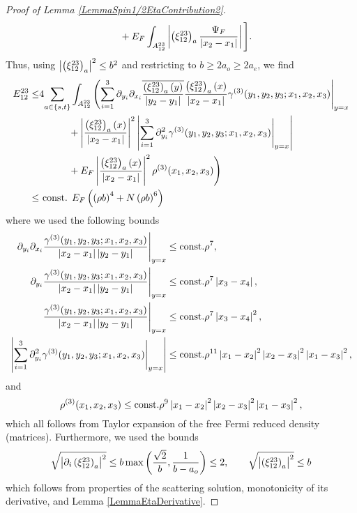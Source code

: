 \begin{proof}[Proof of Lemma \ref{LemmaSpin1/2EtaContribution2}]
\begin{equation}
\begin{aligned}
&\qquad + E_F\int_{A_{12}^{23}} \left\lvert \left(\xi_{12}^{23}\right)_a \frac{\Psi_F}{\left\lvert x_2-x_1 \right\rvert} \right\rvert\Bigg].
\end{aligned}
\end{equation}
 Thus, using $ \left\lvert \left(\xi_{12}^{23}\right)_a \right\rvert^2\leq b^2 $ and restricting to $ b\geq 2a_o\geq2a_e $, we find \begin{equation}
\begin{aligned}
E_{12}^{23}\leq& 4\!\sum_{a\in\{s,t\}} \int_{A_{12}^{23}}\Bigg(\! \sum_{i=1}^{3}\partial_{y_i}\partial_{x_i}\overline{\frac{\left(\xi_{12}^{23}\right)_a(y)}{\left\lvert y_2-y_1 \right\rvert}}\frac{\left(\xi_{12}^{23}\right)_a(x)}{\left\lvert x_2-x_1 \right\rvert}\gamma^{(3)}(y_1,y_2,y_3;x_1,x_2,x_3)\Bigg\rvert_{y=x}\\
&\qquad\quad+\left\lvert \frac{\left(\xi_{12}^{23}\right)_a(x)}{\left\lvert x_2-x_1 \right\rvert} \right\rvert^2\left\lvert \sum_{i=1}^{3}  \partial_{y_i}^2\gamma^{(3)}(y_1,y_2,y_3;x_1,x_2,x_3)\Bigg\rvert_{y=x} \right\rvert\\
&\qquad\quad+E_F\left\lvert \frac{\left(\xi_{12}^{23}\right)_a(x)}{\left\lvert x_2-x_1 \right\rvert} \right\rvert^2\rho^{(3)}(x_1,x_2,x_3)\Bigg)\\
\leq& \text{ const. } E_F\left(\left(\rho b\right)^4+N\left(\rho b\right)^6 \right)
\end{aligned}
\end{equation}
where we used the following bounds \begin{equation}
\begin{aligned}
\partial_{y_i}\partial_{x_i}\frac{\gamma^{(3)}(y_1,y_2,y_3;x_1,x_2,x_3)}{\left\lvert x_2-x_1 \right\rvert\left\lvert y_2-y_1 \right\rvert}\Bigg \lvert_{y=x}&\leq \text{const.} \rho^{7},\\
\partial_{y_i}\frac{\gamma^{(3)}(y_1,y_2,y_3;x_1,x_2,x_3)}{\left\lvert x_2-x_1 \right\rvert\left\lvert y_2-y_1 \right\rvert}\Bigg \lvert_{y=x}&\leq \text{const.} \rho^{7}\left\lvert x_3-x_4 \right\rvert,\\
\frac{\gamma^{(3)}(y_1,y_2,y_3;x_1,x_2,x_3)}{\left\lvert x_2-x_1 \right\rvert\left\lvert y_2-y_1 \right\rvert}\Bigg \lvert_{y=x}&\leq \text{const.} \rho^{7}\left\lvert x_3-x_4 \right\rvert^2,\\
\left\lvert \sum_{i=1}^{3}\partial_{y_i}^2\gamma^{(3)}(y_1,y_2,y_3;x_1,x_2,x_3) \Bigg \lvert_{y=x} \right\rvert&\leq \text{const.} \rho^{11} \left\lvert x_1-x_2 \right\rvert^2\left\lvert x_2-x_3 \right\rvert^2\left\lvert x_1-x_3 \right\rvert^2,
\end{aligned}
\end{equation}
and \begin{equation}
\rho^{(3)}(x_1,x_2,x_3)\leq\text{const.} \rho^9 \left\lvert x_1-x_2 \right\rvert^2\left\lvert x_2-x_3 \right\rvert^2\left\lvert x_1-x_3 \right\rvert^2,
\end{equation}
which all follows from Taylor expansion of the free Fermi reduced density (matrices). Furthermore, we used the bounds \begin{equation}
\sqrt{\left\lvert \partial_i\left(\xi_{12}^{23}\right)_a \right\rvert^2}\leq b \max\left(\frac{\sqrt{2}}{b},\frac{1}{b-a_o}\right)\leq 2,\qquad \sqrt{\left\lvert \left(\xi_{12}^{23}\right)_a \right\rvert^2}\leq b
\end{equation}
which follows from properties of the scattering solution, monotonicity of its derivative, and Lemma \ref{LemmaEtaDerivative}.
\end{proof}
